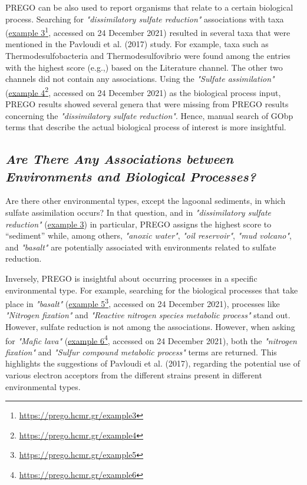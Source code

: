 {   PREGO can be also used to report organisms that relate to a certain biological process. Searching for \textit{"dissimilatory sulfate reduction"} associations with taxa (\href{https://prego.hcmr.gr/example3}{example 3}\footnote{\href{https://prego.hcmr.gr/example3}{https://prego.hcmr.gr/example3}}, accessed on 24 December 2021) resulted in several taxa that were mentioned in the Pavloudi et al. (2017) study. 
   For example, taxa such as Thermodesulfobacteria and Thermodesulfovibrio were found among the entries with the highest score (e.g.,) based on the Literature channel. 
   The other two channels did not contain any associations. 
   Using the \textit{"Sulfate assimilation"} (\href{https://prego.hcmr.gr/example4}{example 4}\footnote{\href{https://prego.hcmr.gr/example4}{https://prego.hcmr.gr/example4}}, accessed on 24 December 2021) as the biological process input, PREGO results showed several genera that were missing from PREGO results concerning the \textit{"dissimilatory sulfate reduction"}. 
   Hence, manual search of GObp terms that describe the actual biological process of interest is more insightful.


   \subsection*{\textit{Are There Any Associations between Environments and Biological Processes?}}
   \label{subsec:envo-proc}

   Are there other environmental types, except the lagoonal sediments, in which sulfate assimilation occurs? In that question, and in \textit{"dissimilatory sulfate reduction"} (\href{https://prego.hcmr.gr/example3}{example 3}) in particular, PREGO assigns the highest score to “sediment” while, among others, \textit{"anoxic water"}, \textit{"oil reservoir"}, \textit{"mud volcano"}, and \textit{"basalt"} are potentially associated with environments related to sulfate reduction.
   
   Inversely, PREGO is insightful about occurring processes in a specific environmental type. 
   For example, searching for the biological processes that take place in \textit{"basalt"} (\href{https://prego.hcmr.gr/example5}{example 5}\footnote{\href{https://prego.hcmr.gr/example5}{https://prego.hcmr.gr/example5}}, accessed on 24 December 2021), processes like \textit{"Nitrogen fixation"} and \textit{"Reactive nitrogen species metabolic process"} stand out. 
   However, sulfate reduction is not among the associations. 
   However, when asking for \textit{"Mafic lava"} (\href{https://prego.hcmr.gr/example6}{example 6}\footnote{\href{https://prego.hcmr.gr/example6}{https://prego.hcmr.gr/example6}}, accessed on 24 December 2021), both the \textit{"nitrogen fixation"} and \textit{"Sulfur compound metabolic process"} terms are returned. 
   This highlights the suggestions of Pavloudi et al. (2017), regarding the potential use of various electron acceptors from the different strains present in different environmental types.


}
